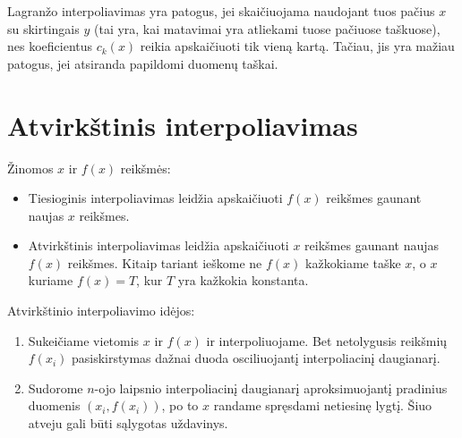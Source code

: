 

Lagranžo interpoliavimas yra patogus, jei skaičiuojama naudojant tuos
pačius $x$ su skirtingais $y$ (tai yra, kai matavimai yra atliekami
tuose pačiuose taškuose), nes koeficientus $c_{k}(x)$ reikia
apskaičiuoti tik vieną kartą. Tačiau, jis yra mažiau patogus, jei
atsiranda papildomi duomenų taškai.


\section{Atvirkštinis interpoliavimas}


Žinomos $x$ ir $f(x)$ reikšmės:
\begin{itemize}
  \item Tiesioginis interpoliavimas leidžia apskaičiuoti $f(x)$ reikšmes
    gaunant naujas $x$ reikšmes.
  \item Atvirkštinis interpoliavimas leidžia apskaičiuoti $x$ reikšmes
    gaunant naujas $f(x)$ reikšmes. Kitaip tariant ieškome ne $f(x)$ kažkokiame
    taške $x$, o $x$ kuriame $f(x) = T$, kur $T$ yra kažkokia konstanta.
\end{itemize}

Atvirkštinio interpoliavimo idėjos:
\begin{enumerate}
  \item Sukeičiame vietomis $x$ ir $f(x)$ ir interpoliuojame. Bet
    netolygusis reikšmių $f(x_{i})$ pasiskirstymas dažnai duoda
    osciliuojantį interpoliacinį daugianarį.
  \item Sudorome $n$-ojo laipsnio interpoliacinį daugianarį
    aproksimuojantį pradinius duomenis $(x_{i},f(x_{i}))$, po to $x$
    randame spręsdami netiesinę lygtį. Šiuo atveju gali būti sąlygotas
    uždavinys.
\end{enumerate}



